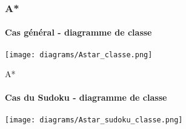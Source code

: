 
\begin{frame}
    \frametitle{A*}
	\framesubtitle{Cas général - diagramme de classe}

\begin{center}

\texttt{[image: diagrams/Astar\_classe.png]}

\end{center}

\end{frame}


\begin{frame}{A*}

\framesubtitle{Cas du Sudoku - diagramme de classe}

\begin{center}

\texttt{[image: diagrams/Astar\_sudoku\_classe.png]}

\end{center}

\end{frame}
